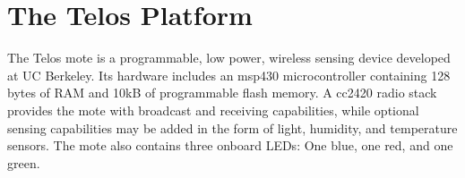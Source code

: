 
\section{The Telos Platform}

The Telos mote \cite{polastre:2005} is a programmable, low power, wireless sensing device developed at UC Berkeley. Its hardware includes an msp430 microcontroller containing 128 bytes of RAM and 10kB of programmable flash memory. A cc2420 radio stack provides the mote with broadcast and receiving capabilities, while optional sensing capabilities may be added in the form of light, humidity, and temperature sensors. The mote also contains three onboard LEDs: One blue, one red, and one green.

